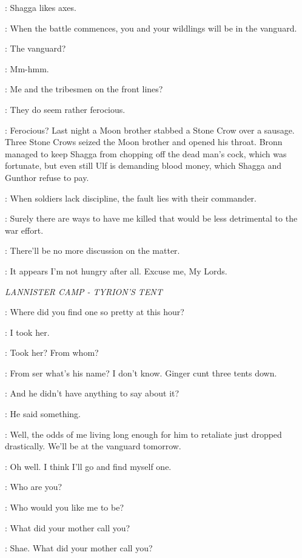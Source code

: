 \TYRION: Shagga likes axes. 

\TYWIN: When the battle commences, you and your wildlings will be in the vanguard. 

\TYRION: The vanguard? 

\TYWIN: Mm-hmm. 

\TYRION: Me and the tribesmen on the front lines? 

\KEVAN: They do seem rather ferocious. 

\TYRION: Ferocious? Last night a Moon brother stabbed a Stone Crow over a sausage. Three Stone Crows seized the Moon brother and opened his throat. Bronn managed to keep Shagga from chopping off the dead man's cock, which was fortunate, but even still Ulf is demanding blood money, which Shagga and Gunthor refuse to pay. 

\TYWIN: When soldiers lack discipline, the fault lies with their commander. 

\TYRION: Surely there are ways to have me killed that would be less detrimental to the war effort. 

\TYWIN: There'll be no more discussion on the matter. 

\TYRION: It appears I'm not hungry after all. Excuse me, My Lords. 

\scene

\textit{LANNISTER CAMP - TYRION'S TENT} 


\TYRION: Where did you find one so pretty at this hour? 

\BRONN: I took her. 

\TYRION: Took her? From whom? 

\BRONN: From ser what's his name? I don't know. Ginger cunt three tents down. 

\TYRION: And he didn't have anything to say about it? 

\BRONN: He said something. 

\TYRION: Well, the odds of me living long enough for him to retaliate just dropped drastically. We'll be at the vanguard tomorrow. 

\BRONN: Oh well. I think I'll go and find myself one. 

\TYRION: Who are you? 

\SHAE: Who would you like me to be? 

\TYRION: What did your mother call you? 

\SHAE: Shae. What did your mother call you? 

